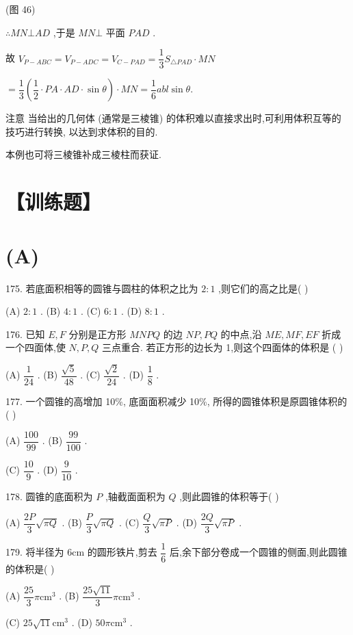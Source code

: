 (图 46)

$\therefore {MN} \bot  {AD}$ ,于是 ${MN} \bot$ 平面 ${PAD}$ .

故 ${V}_{P - {ABC}} = {V}_{P - {ADC}} = {V}_{C - {PAD}} = \dfrac{1}{3}{S}_{\bigtriangleup {PAD}} \cdot  {MN}$

$= \dfrac{1}{3}\left( {\dfrac{1}{2} \cdot  {PA} \cdot  {AD} \cdot  \sin \theta }\right)  \cdot  {MN} = \dfrac{1}{6}{abl}\sin \theta .$

注意 当给出的几何体 (通常是三棱锥) 的体积难以直接求出时,可利用体积互等的技巧进行转换, 以达到求体积的目的.

本例也可将三棱锥补成三棱柱而获证.

\section*{【训练题】}

\section*{(A)}

175. 若底面积相等的圆锥与圆柱的体积之比为 $2 : 1$ ,则它们的高之比是(   )

(A) $2 : 1$ . (B) $4 : 1$ . (C) $6 : 1$ . (D) $8 : 1$ .

176. 已知 $E,F$ 分别是正方形 ${MNPQ}$ 的边 ${NP},{PQ}$ 的中点,沿 ${ME},{MF},{EF}$ 折成一个四面体,使 $N,P,Q$ 三点重合. 若正方形的边长为 1,则这个四面体的体积是 (   )

(A) $\dfrac{1}{24}$ . (B) $\dfrac{\sqrt{5}}{48}$ . (C) $\dfrac{\sqrt{2}}{24}$ . (D) $\dfrac{1}{8}$ .

177. 一个圆锥的高增加 10\%, 底面面积减少 10\%, 所得的圆锥体积是原圆锥体积的(   )

(A) $\dfrac{100}{99}$ . (B) $\dfrac{99}{100}$ .

(C) $\dfrac{10}{9}$ . (D) $\dfrac{9}{10}$ .

178. 圆锥的底面积为 $P$ ,轴截面面积为 $Q$ ,则此圆锥的体积等于(   )

(A) $\dfrac{2P}{3}\sqrt{\pi Q}$ . (B) $\dfrac{P}{3}\sqrt{\pi Q}$ . (C) $\dfrac{Q}{3}\sqrt{\pi P}$ . (D) $\dfrac{2Q}{3}\sqrt{\pi P}$ .

179. 将半径为 $6\mathrm{{cm}}$ 的圆形铁片,剪去 $\dfrac{1}{6}$ 后,余下部分卷成一个圆锥的侧面,则此圆锥的体积是(   )

(A) $\dfrac{25}{3}\pi {\mathrm{{cm}}}^{3}$ . (B) $\dfrac{{25}\sqrt{11}}{3}\pi {\mathrm{{cm}}}^{3}$ .

(C) ${25}\sqrt{11}{\mathrm{{cm}}}^{3}$ . (D) ${50\pi }{\mathrm{{cm}}}^{3}$ .

